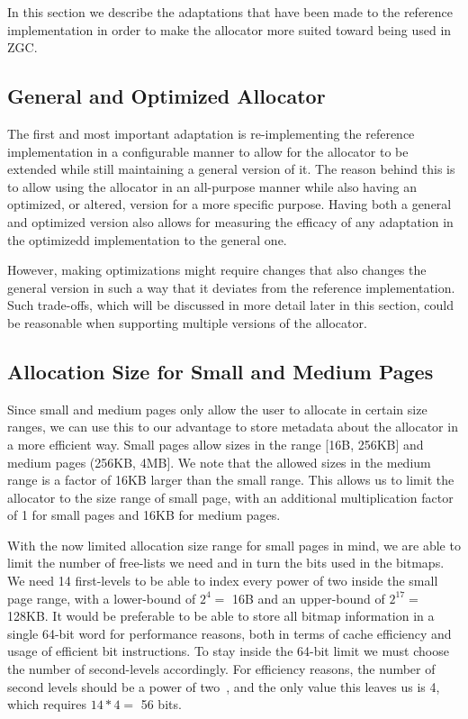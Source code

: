 
In this section we describe the adaptations that have been made to the reference implementation in order to make the allocator more suited toward being used in ZGC.

\subsection{General and Optimized Allocator}

The first and most important adaptation is re-implementing the reference implementation in a configurable manner to allow for the allocator to be extended while still maintaining a general version of it. The reason behind this is to allow using the allocator in an all-purpose manner while also having an optimized, or altered, version for a more specific purpose. Having both a general and optimized version also allows for measuring the efficacy of any adaptation in the optimizedd implementation to the general one.

However, making optimizations might require changes that also changes the general version in such a way that it deviates from the reference implementation. Such trade-offs, which will be discussed in more detail later in this section, could be reasonable when supporting multiple versions of the allocator.

\subsection{Allocation Size for Small and Medium Pages}

Since small and medium pages only allow the user to allocate in certain size ranges, we can use this to our advantage to store metadata about the allocator in a more efficient way. Small pages allow sizes in the range [16B, 256KB] and medium pages (256KB, 4MB]. We note that the allowed sizes in the medium range is a factor of 16KB larger than the small range. This allows us to limit the allocator to the size range of small page, with an additional multiplication factor of 1 for small pages and 16KB for medium pages.

With the now limited allocation size range for small pages in mind, we are able to limit the number of free-lists we need and in turn the bits used in the bitmaps. We need 14 first-levels to be able to index every power of two inside the small page range, with a lower-bound of $2^4 =$ 16B and an upper-bound of $2^{17} =$ 128KB. It would be preferable to be able to store all bitmap information in a single 64-bit word for performance reasons, both in terms of cache efficiency and usage of efficient bit instructions. To stay inside the 64-bit limit we must choose the number of second-levels accordingly. For efficiency reasons, the number of second levels should be a power of two~\cite{tlsf}, and the only value this leaves us is 4, which requires $14 * 4 =$ 56 bits.

